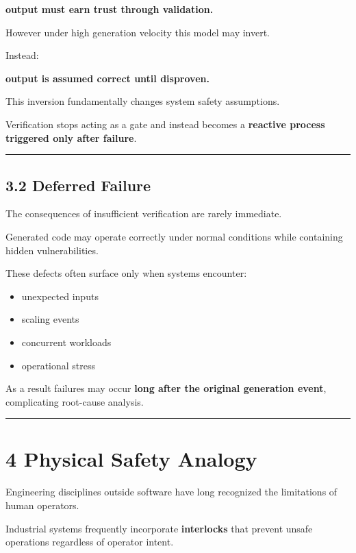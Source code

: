 \documentclass[
]{article}
\providecommand{\tightlist}{%
  \setlength{\itemsep}{0pt}\setlength{\parskip}{0pt}}
\begin{document}
\textbf{output must earn trust through validation.}

However under high generation velocity this model may invert.

Instead:

\textbf{output is assumed correct until disproven.}

This inversion fundamentally changes system safety assumptions.

Verification stops acting as a gate and instead becomes a
\textbf{reactive process triggered only after failure}.

\begin{center}\rule{0.5\linewidth}{0.5pt}\end{center}

\subsection{3.2 Deferred Failure}\label{32-deferred-failure}

The consequences of insufficient verification are rarely immediate.

Generated code may operate correctly under normal conditions while
containing hidden vulnerabilities.

These defects often surface only when systems encounter:

\begin{itemize}
\tightlist
\item
  unexpected inputs
\item
  scaling events
\item
  concurrent workloads
\item
  operational stress
\end{itemize}

As a result failures may occur \textbf{long after the original
generation event}, complicating root-cause analysis.

\begin{center}\rule{0.5\linewidth}{0.5pt}\end{center}

\section{4 Physical Safety Analogy}\label{4-physical-safety-analogy}

Engineering disciplines outside software have long recognized the
limitations of human operators.

Industrial systems frequently incorporate \textbf{interlocks} that
prevent unsafe operations regardless of operator intent.
\end{document}
